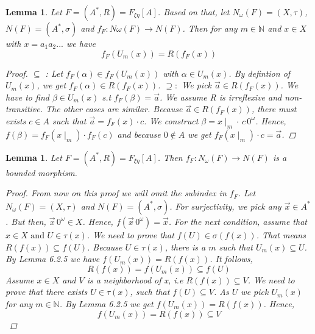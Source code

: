 \documentclass[12pt, a4paper]{scrartcl}
\newtheorem{lemma}[definition]{Lemma}
\begin{document}
\begin{lemma}
    Let $F = (A^*, R) = F_{\xi \eta}[A]$. Based on that, let $N_\omega(F) = (X,\tau)$, $N(F) = (A^*, \sigma)$ and $f_F : N\omega(F) \rightarrow N(F)$.
    Then for any $m \in \mathbb{N}$ and $x\in X$ with $x = a_1a_2...$ \newline we have $$f_F(U_m(x)) = R(f_F(x))$$
    \begin{proof}
            $\subseteq$ : Let $f_F(\alpha) \in f_F(U_m(x))$ with $\alpha \in U_m(x)$. By defintion of $U_m(x)$,
            we get $f_F(\alpha) \in R(f_F(x))$. \newline \newline
            $\supseteq :$ We pick $\vec{a} \in R(f_F(x))$. We have to find $\beta \in U_m(x)$ s.t $f_F(\beta) = \vec{a}$. We assume R is irreflexive and non-transitive.
            The other cases are similar. \newline
            Because $\vec{a} \in R(f_F(x))$, there must exists $c \in A$ such that $ \vec{a} = f_F(x) \cdot c $.
            We construct $\beta = x \mid_m \cdot \, c\, 0^\omega$. Hence, $f(\beta) = f_F(x \mid_m) \cdot f_F(c)$ and because $ 0 \notin A$ we get $f_F(x \mid_m) \cdot c = \vec{a}$.
            
    \end{proof}
\end{lemma}

\begin{lemma}
    Let $F =(A^*,R) = F_{\xi \eta}[A]$. Then $f_F : N_\omega(F) \rightarrow N(F)$ is a bounded morphism.

    \begin{proof}
        From now on this proof we will omit the subindex in $f_F$.
        Let $N_\omega(F) = (X, \tau)$ and $N(F) =(A^*, \sigma)$. \newline \newline For surjectivity, we pick any $\vec{x} \in A^*$. But then, $\vec{x}\,0^\omega \in X$. Hence, $f(\vec{x}\, 0^\omega) = \vec{x}$. \newline 
        For the next condition, assume that $x \in X \mbox{ and } U \in \tau(x)$. We need to prove that $f(U) \in \sigma(f(x))$. That means $R(f(x)) \subseteq f(U)$. Because $U \in \tau(x)$, there is a $m$ such that
        $U_m(x) \subseteq U$. By Lemma 6.2.5 we have $f(U_m(x)) = R(f(x))$. It follows, 
        $$R(f(x)) = f(U_m(x)) \subseteq f(U)$$ 
        \newline
        Assume $x\in X$ and $V$ is a neighborhood of x, i.e $R(f(x)) \subseteq V$. We need to prove that there exists $U \in \tau(x)$, such that $f(U)\subseteq V$.
        As $U$ we pick $U_m(x)$ for any $m \in \mathbb{N}$. By Lemma 6.2.5 we get $f(U_m(x)) = R(f(x))$. Hence, 
        $$f(U_m(x)) = R(f(x)) \subseteq V$$

    \end{proof} 
\end{lemma}
\end{document}
